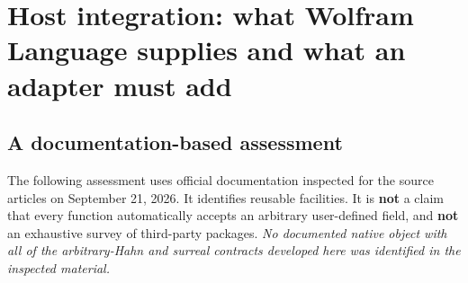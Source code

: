 \documentclass[11pt,letterpaper]{article}
\numberwithin{equation}{section}
\theoremstyle{definition}
\theoremstyle{remark}
\begin{document}
\section{Host integration: what Wolfram Language supplies and what an adapter must add}
\label{cas:sec-host}

\subsection{A documentation-based assessment}
\label{cas:sub-docassessment}
The following assessment uses official documentation inspected for the source
articles on September 21, 2026. It identifies reusable facilities. It is
\textbf{not} a claim that every function automatically accepts an arbitrary
user-defined field, and \textbf{not} an exhaustive survey of third-party
packages. \emph{No documented native object with all of the arbitrary-Hahn and
surreal contracts developed here was identified in the inspected material.}
\end{document}
